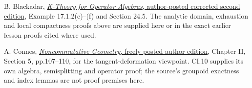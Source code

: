 \documentclass[
  11pt,
]{article}
\begin{document}
B. Blackadar,
\href{https://www.bruceblackadar.com/Mathematics/book6.pdf}{\emph{K-Theory
for Operator Algebras}, author-posted corrected second edition}, Example
17.1.2(e)--(f) and Section 24.5. The analytic domain, exhaustion and
local compactness proofs above are supplied here or in the exact earlier
lesson proofs cited where used.

A. Connes,
\href{https://alainconnes.org/wp-content/uploads/book94bigpdf.pdf}{\emph{Noncommutative
Geometry}, freely posted author edition}, Chapter II, Section 5,
pp.107--110, for the tangent-deformation viewpoint. CI.10 supplies its
own algebra, semisplitting and operator proof; the source's groupoid
exactness and index lemmas are not proof premises here.
\end{document}
